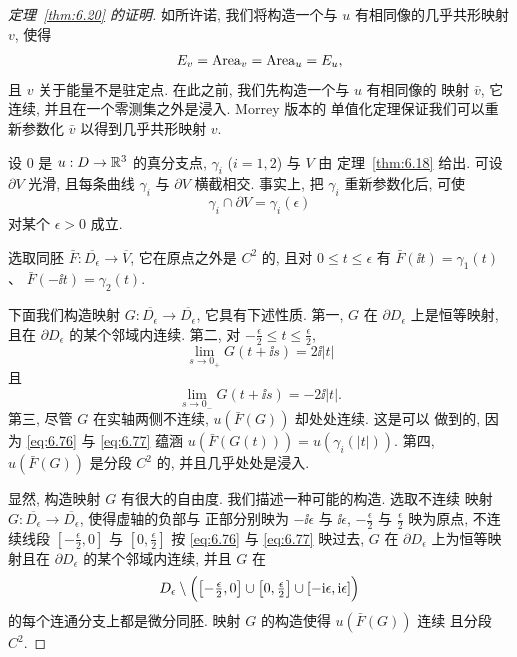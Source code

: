 \begin{proof}[定理~\ref{thm:6.20} 的证明]
如所许诺, 我们将构造一个与 $u$ 有相同像的几乎共形映射 $v$, 使得
\begin{equation}
E_v=\operatorname{Area}_v=\operatorname{Area}_u=E_u,
\label{eq:6.74}
\end{equation}
且 $v$ 关于能量不是驻定点. 在此之前, 我们先构造一个与 $u$ 有相同像的
映射 $\bar{v}$, 它连续, 并且在一个零测集之外是浸入. Morrey 版本的
单值化定理保证我们可以重新参数化 $\bar{v}$ 以得到几乎共形映射 $v$.

设 $0$ 是 $u:D\to\mathbb{R}^3$ 的真分支点, $\gamma_i$ ($i=1,2$) 与 $V$ 由
定理~\ref{thm:6.18} 给出. 可设 $\partial V$ 光滑, 且每条曲线 $\gamma_i$
与 $\partial V$ 横截相交. 事实上, 把 $\gamma_i$ 重新参数化后, 可使
\begin{equation}
\gamma_i\cap\partial V=\gamma_i(\epsilon)
\label{eq:6.75}
\end{equation}
对某个 $\epsilon>0$ 成立.

选取同胚 $\bar{F}:\overline{D_\epsilon}\to\overline{V}$, 它在原点之外是
$C^2$ 的, 且对 $0\leq t\leq\epsilon$ 有 $\bar{F}(\ii t)=\gamma_1(t)$、
$\bar{F}(-\ii t)=\gamma_2(t)$.

下面我们构造映射 $G:\overline{D_\epsilon}\to\overline{D_\epsilon}$,
它具有下述性质. 第一, $G$ 在 $\partial D_\epsilon$ 上是恒等映射, 且在
$\partial D_\epsilon$ 的某个邻域内连续. 第二, 对
$-\frac{\epsilon}{2}\leq t\leq\frac{\epsilon}{2}$,
\begin{equation}
\lim_{s\to0_+}G(t+\ii s)=2\ii|t|
\label{eq:6.76}
\end{equation}
且
\begin{equation}
\lim_{s\to0_-}G(t+\ii s)=-2\ii|t|.
\label{eq:6.77}
\end{equation}
第三, 尽管 $G$ 在实轴两侧不连续, $u(\bar{F}(G))$ 却处处连续. 这是可以
做到的, 因为 \eqref{eq:6.76} 与 \eqref{eq:6.77} 蕴涵
$u(\bar{F}(G(t)))=u(\gamma_i(|t|))$. 第四, $u(\bar{F}(G))$ 是分段 $C^2$
的, 并且几乎处处是浸入.

显然, 构造映射 $G$ 有很大的自由度. 我们描述一种可能的构造. 选取不连续
映射 $G:\overline{D_\epsilon}\to\overline{D_\epsilon}$, 使得虚轴的负部与
正部分别映为 $-\ii\epsilon$ 与 $\ii\epsilon$, $-\frac{\epsilon}{2}$ 与
$\frac{\epsilon}{2}$ 映为原点, 不连续线段
$[-\frac{\epsilon}{2},0]$ 与 $[0,\frac{\epsilon}{2}]$ 按 \eqref{eq:6.76}
与 \eqref{eq:6.77} 映过去, $G$ 在 $\partial D_\epsilon$ 上为恒等映射且在
$\partial D_\epsilon$ 的某个邻域内连续, 并且 $G$ 在
\begin{equation}
D_\epsilon\setminus\Bigl(\bigl[-\tfrac{\epsilon}{2},0\bigr]
\cup\bigl[0,\tfrac{\epsilon}{2}\bigr]\cup[-\mathrm{i}\epsilon,\mathrm{i}\epsilon]\Bigr)
\label{eq:6.78}
\end{equation}
的每个连通分支上都是微分同胚. 映射 $G$ 的构造使得 $u(\bar{F}(G))$ 连续
且分段 $C^2$.


\end{proof}
